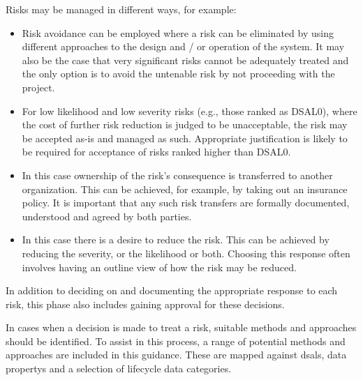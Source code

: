 Risks may be managed in different ways, for example:

\begin{itemize}
  \item {}
	
	Risk avoidance can be employed where a risk can be eliminated by using different approaches to the design and / or operation of the system. It may also be the case that very significant risks cannot be adequately treated and the only option is to avoid the untenable risk by not proceeding with the project.

  \item {} 
	
    For low likelihood and low severity risks (e.g., those ranked as DSAL0), where the cost of further risk reduction is judged to be unacceptable, the risk may be accepted as-is and managed as such. Appropriate justification is likely to be required for acceptance of risks ranked higher than DSAL0.
\clearpage   
  \item {} 
	
	In this case ownership of the risk's consequence is transferred to another organization. This can be achieved, for example, by taking out an insurance policy. It is important that any such risk transfers are formally documented, understood and
	agreed
	by both parties.

  \item {} 
	
	In this case there is a desire to reduce the risk. This can be achieved by reducing the severity, or the likelihood or both. Choosing this \gls{response} often involves having an outline view of how the risk may be reduced. 
\end{itemize}

In addition to deciding on and documenting the appropriate \gls{response} to each risk, this phase also includes gaining approval for these decisions.

In cases when a decision is made to treat a risk, suitable methods and approaches should be identified. To assist in this process, a range of potential methods and approaches are included in this guidance. These are mapped against \glspl{dsal}, \glspl{data property} and a selection of lifecycle data categories.

